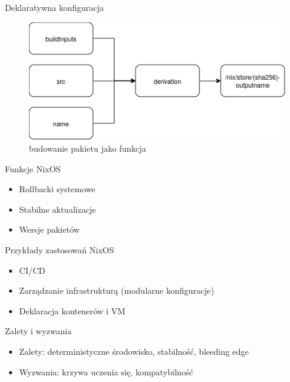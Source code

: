 \documentclass{beamer}
\begin{document}
\begin{frame}{Deklaratywna konfiguracja}
    \begin{figure}
        \includegraphics[width=\linewidth]{./assets/derivation.png}
        \caption*{\scriptsize budowanie pakietu jako funkcja}
    \end{figure}
\end{frame}

\begin{frame}{Funkcje NixOS}
    \begin{itemize}
        \item Rollbacki systemowe
        \item Stabilne aktualizacje
        \item Wersje pakietów
    \end{itemize}
\end{frame}

\begin{frame}{Przykłady zastosowań NixOS}
    \begin{itemize}
        \item CI/CD
        \item Zarządzanie infrastrukturą (modularne konfiguracje)
        \item Deklaracja kontenerów i VM
    \end{itemize}
\end{frame}

\begin{frame}{Zalety i wyzwania}
    \begin{itemize}
        \item Zalety: deterministyczne środowisko, stabilność, bleeding edge
        \item Wyzwania: krzywa uczenia się, kompatybilność
    \end{itemize}
\end{frame}
\end{document}
